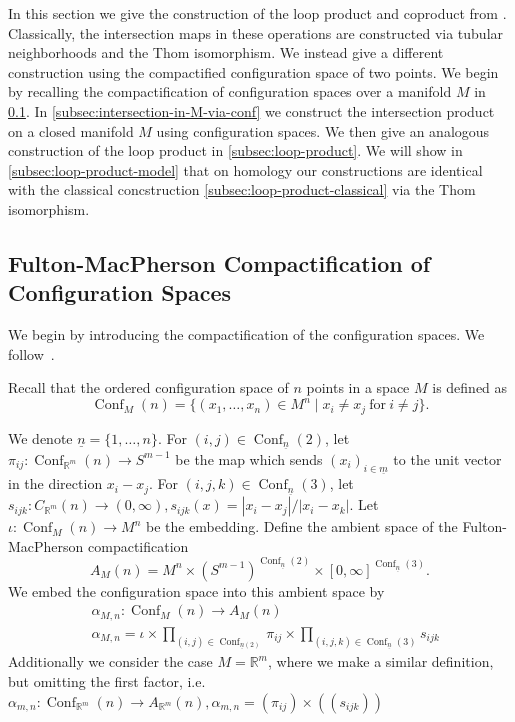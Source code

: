 \documentclass{scrartcl}
\theoremstyle{plain}
\theoremstyle{definition}
\newcommand{\R}{\mathbb R}
\newcommand{\abs}[1]{\left\lvert#1\right\rvert}
\DeclareMathOperator{\Conf}{Conf}
\begin{document}
In this section we give the construction of the loop product and coproduct from \cite{naef2019string}. Classically, the intersection maps in these operations are constructed via tubular neighborhoods and the Thom isomorphism. We instead give a different construction using the compactified configuration space of two points. We begin by recalling the compactification of configuration spaces over a manifold $M$ in \cref{subsec:compactificatified-configuration-space}. In \cref{subsec:intersection-in-M-via-conf} we construct the intersection product on a closed manifold $M$ using configuration spaces. We then give an analogous construction of the loop product in \cref{subsec:loop-product}. We will show in \ref{subsec:loop-product-model} that on homology our constructions are identical with the classical concstruction \ref{subsec:loop-product-classical} via the Thom isomorphism. 

\subsection{Fulton-MacPherson Compactification of Configuration Spaces}\label{subsec:compactificatified-configuration-space}

We begin by introducing the compactification of the configuration spaces. We follow~\cite{sinha2004manifold}.

Recall that the ordered configuration space of $n$ points in a space $M$ is defined as $$\Conf_M(n) = \{(x_1, \dots, x_n)\in M^n\mid x_i\neq x_j\ \text{for}\ i\neq j\}.$$ 

We denote $\underline n=\{1,\dots,n\}$. For $(i,j)\in \Conf_{\underline n}(2)$, let $\pi_{ij}\colon \Conf_{\R^m}(n)\to S^{m-1}$ be the map which sends $(x_i)_{i\in\underline m}$ to the unit vector in the direction $x_i-x_j$. For $(i,j,k)\in\Conf_{\underline n}(3)$, let $s_{ijk}\colon C_{\R^m}(n) \to (0, \infty), s_{ijk}(x) = \abs{x_i-x_j} / \abs{x_i-x_k}$. Let $\iota\colon\Conf_M(n)\to M^n$ be the embedding. Define the ambient space of the Fulton-MacPherson compactification $$A_M(n) = M^{n} \times (S^{m-1})^{\Conf_{\underline n}(2)} \times [0, \infty]^{\Conf_{\underline n}(3)}.$$ We embed the configuration space into this ambient space by 
\begin{align*}
    &\alpha_{M,n} \colon \Conf_M(n) \to A_M(n)\\
    &\alpha_{M,n} = \iota \times \prod_{(i,j)\in \Conf_{\underline n(2)}}\pi_{ij} \times \prod_{(i, j, k)\in\Conf_{\underline n}(3)}s_{ijk}
\end{align*}
Additionally we consider the case $M=\R^m$, where we make a similar definition, but omitting the first factor, i.e. $\alpha_{m,n} \colon \Conf_{\R^m}(n) \to A_{\R^m}(n), \alpha_{m,n} = \left(\pi_{ij}\right) \times \left((s_{ijk})\right)$
\end{document}
